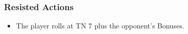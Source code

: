 \subsubsection*{Resisted Actions}

\begin{itemize}
  \item
  The player rolls at TN 7 plus the opponent's Bonuses.
\end{itemize}
